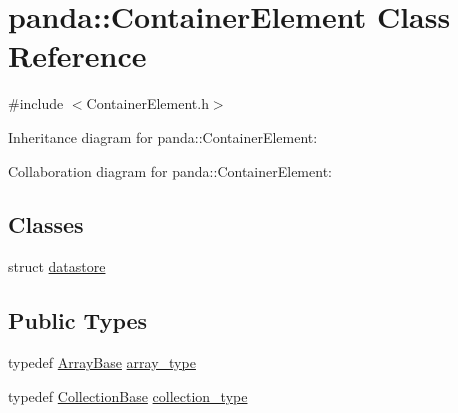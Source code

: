 \hypertarget{classpanda_1_1ContainerElement}{\section{panda\-:\-:Container\-Element Class Reference}
\label{classpanda_1_1ContainerElement}
}


{\ttfamily \#include $<$Container\-Element.\-h$>$}



Inheritance diagram for panda\-:\-:Container\-Element\-:


Collaboration diagram for panda\-:\-:Container\-Element\-:
\subsection*{Classes}
\begin{DoxyCompactItemize}
\item 
struct \hyperlink{structpanda_1_1ContainerElement_1_1datastore}{datastore}
\end{DoxyCompactItemize}
\subsection*{Public Types}
\begin{DoxyCompactItemize}
\item 
typedef \hyperlink{classpanda_1_1ArrayBase}{Array\-Base} \hyperlink{classpanda_1_1ContainerElement_a1a6e0c3781940f68a54ffa9879c5b832}{array\-\_\-type}
\item 
typedef \hyperlink{classpanda_1_1CollectionBase}{Collection\-Base} \hyperlink{classpanda_1_1ContainerElement_a942f7fc985a476f786ca8d95a94233f8}{collection\-\_\-type}
\end{DoxyCompactItemize}
